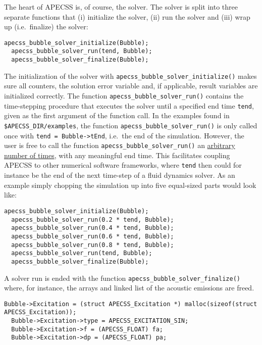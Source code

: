 The heart of APECSS is, of course, the solver. The solver is split into three separate functions that (i) initialize the solver, (ii) run the solver and (iii) wrap up (i.e.~finalize) the solver:
\begin{lstlisting}[style=CStyle]
  apecss_bubble_solver_initialize(Bubble);
  apecss_bubble_solver_run(tend, Bubble);
  apecss_bubble_solver_finalize(Bubble);
\end{lstlisting}\vspace{-0.75em}
The initialization of the solver with {\tt apecss\_bubble\_solver\_initialize()} makes sure all counters, the solution error variable and, if applicable, result variables are initialized correctly. The function {\tt apecss\_bubble\_solver\_run()} contains the time-stepping procedure that executes the solver until a specified end time {\tt tend}, given as the first argument of the function call. In the examples found in {\tt \$APECSS\_DIR/examples}, the function {\tt apecss\_bubble\_solver\_run()} is only called once with {\tt tend = Bubble->tEnd}, i.e.~the end of the simulation. However, the user is free to call the function {\tt apecss\_bubble\_solver\_run()} an \underline{arbitrary number of times}, with any meaningful end time. This facilitates coupling APECSS to other numerical software frameworks, where {\tt tend} then could for instance be the end of the next time-step of a fluid dynamics solver. As an example simply chopping the simulation up into five equal-sized parts would look like:
\begin{lstlisting}[style=CStyle]
  apecss_bubble_solver_initialize(Bubble);
  apecss_bubble_solver_run(0.2 * tend, Bubble);
  apecss_bubble_solver_run(0.4 * tend, Bubble);
  apecss_bubble_solver_run(0.6 * tend, Bubble);
  apecss_bubble_solver_run(0.8 * tend, Bubble);
  apecss_bubble_solver_run(tend, Bubble);
  apecss_bubble_solver_finalize(Bubble);
\end{lstlisting}\vspace{-0.75em}
A solver run is ended with the function {\tt apecss\_bubble\_solver\_finalize()} where, for instance, the arrays and linked list of the acoustic emissions are freed.

\begin{lstlisting}[style=CStyle]
  Bubble->Excitation = (struct APECSS_Excitation *) malloc(sizeof(struct APECSS_Excitation));
  Bubble->Excitation->type = APECSS_EXCITATION_SIN;
  Bubble->Excitation->f = (APECSS_FLOAT) fa;
  Bubble->Excitation->dp = (APECSS_FLOAT) pa;
\end{lstlisting}


